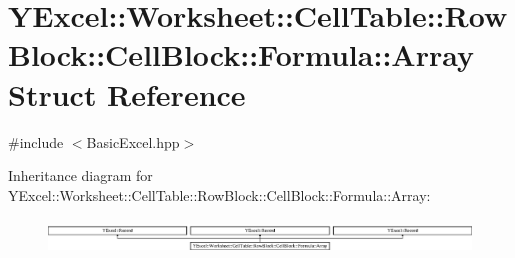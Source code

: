 \hypertarget{struct_y_excel_1_1_worksheet_1_1_cell_table_1_1_row_block_1_1_cell_block_1_1_formula_1_1_array}{}\section{Y\+Excel\+:\+:Worksheet\+:\+:Cell\+Table\+:\+:Row\+Block\+:\+:Cell\+Block\+:\+:Formula\+:\+:Array Struct Reference}
\label{struct_y_excel_1_1_worksheet_1_1_cell_table_1_1_row_block_1_1_cell_block_1_1_formula_1_1_array}


{\ttfamily \#include $<$Basic\+Excel.\+hpp$>$}

Inheritance diagram for Y\+Excel\+:\+:Worksheet\+:\+:Cell\+Table\+:\+:Row\+Block\+:\+:Cell\+Block\+:\+:Formula\+:\+:Array\+:\begin{figure}[H]
\begin{center}
\leavevmode
\includegraphics[height=0.945148cm]{struct_y_excel_1_1_worksheet_1_1_cell_table_1_1_row_block_1_1_cell_block_1_1_formula_1_1_array}
\end{center}
\end{figure}
